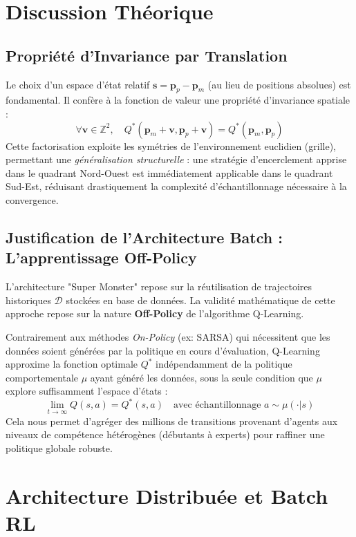 \documentclass[12pt,a4paper]{article}
\newcommand{\state}{\mathbf{s}}
\begin{document}
\section{Discussion Théorique}

\subsection{Propriété d'Invariance par Translation}
Le choix d'un espace d'état relatif $\state = \mathbf{p}_p - \mathbf{p}_m$ (au lieu de positions absolues) est fondamental. Il confère à la fonction de valeur une propriété d'invariance spatiale :
\begin{equation}
    \forall \mathbf{v} \in \mathbb{Z}^2, \quad Q^*(\mathbf{p}_m + \mathbf{v}, \mathbf{p}_p + \mathbf{v}) = Q^*(\mathbf{p}_m, \mathbf{p}_p)
\end{equation}
Cette factorisation exploite les symétries de l'environnement euclidien (grille), permettant une \textit{généralisation structurelle} : une stratégie d'encerclement apprise dans le quadrant Nord-Ouest est immédiatement applicable dans le quadrant Sud-Est, réduisant drastiquement la complexité d'échantillonnage nécessaire à la convergence.

\subsection{Justification de l'Architecture Batch : L'apprentissage Off-Policy}
L'architecture "Super Monster" repose sur la réutilisation de trajectoires historiques $\mathcal{D}$ stockées en base de données. La validité mathématique de cette approche repose sur la nature \textbf{Off-Policy} de l'algorithme Q-Learning.

Contrairement aux méthodes \textit{On-Policy} (ex: SARSA) qui nécessitent que les données soient générées par la politique en cours d'évaluation, Q-Learning approxime la fonction optimale $Q^*$ indépendamment de la politique comportementale $\mu$ ayant généré les données, sous la seule condition que $\mu$ explore suffisamment l'espace d'états :
\begin{equation}
    \lim_{t \to \infty} Q(s,a) = Q^*(s,a) \quad \text{avec échantillonnage } a \sim \mu(\cdot|s)
\end{equation}
Cela nous permet d'agréger des millions de transitions provenant d'agents aux niveaux de compétence hétérogènes (débutants à experts) pour raffiner une politique globale robuste.

\section{Architecture Distribuée et Batch RL}
\end{document}
